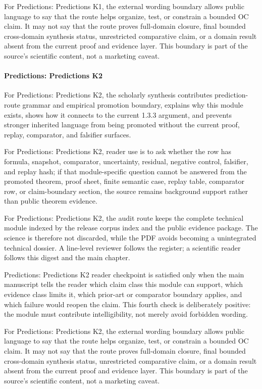 For Predictions: Predictions K1, the external wording boundary allows public language to say that the route helps organize, test, or constrain a bounded OC claim. It may not say that the route proves full-domain closure, final bounded cross-domain synthesis status, unrestricted comparative claim, or a domain result absent from the current proof and evidence layer. This boundary is part of the source's scientific content, not a marketing caveat.


\paragraph{Predictions: Predictions K2}

For Predictions: Predictions K2, the scholarly synthesis contributes prediction-route grammar and empirical promotion boundary, explains why this module exists, shows how it connects to the current 1.3.3 argument, and prevents stronger inherited language from being promoted without the current proof, replay, comparator, and falsifier surfaces.


For Predictions: Predictions K2, reader use is to ask whether the row has formula, snapshot, comparator, uncertainty, residual, negative control, falsifier, and replay hash; if that module-specific question cannot be answered from the promoted theorem, proof sheet, finite semantic case, replay table, comparator row, or claim-boundary section, the source remains background support rather than public theorem evidence.


For Predictions: Predictions K2, the audit route keeps the complete technical module indexed by the release corpus index and the public evidence package. The science is therefore not discarded, while the PDF avoids becoming a unintegrated technical dossier. A line-level reviewer follows the register; a scientific reader follows this digest and the main chapter.


Predictions: Predictions K2 reader checkpoint is satisfied only when the main manuscript tells the reader which claim class this module can support, which evidence class limits it, which prior-art or comparator boundary applies, and which failure would reopen the claim. This fourth check is deliberately positive: the module must contribute intelligibility, not merely avoid forbidden wording.


For Predictions: Predictions K2, the external wording boundary allows public language to say that the route helps organize, test, or constrain a bounded OC claim. It may not say that the route proves full-domain closure, final bounded cross-domain synthesis status, unrestricted comparative claim, or a domain result absent from the current proof and evidence layer. This boundary is part of the source's scientific content, not a marketing caveat.


